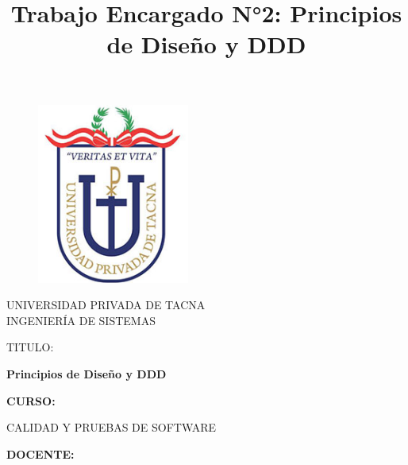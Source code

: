 \documentclass{article}
\begin{document}
\title{Trabajo Encargado N°2: Principios de Diseño y DDD}

\begin{titlepage}
\begin{figure}[htb]
\begin{center}
\includegraphics[width=5cm]{logo.png}
\end{center}
\end{figure}
\vspace*{-0.25in}
\begin{center}
\large{UNIVERSIDAD PRIVADA DE TACNA}\\
\vspace*{-0.025in}
INGENIERÍA DE SISTEMAS  \\

\vspace*{0.5in}
\begin{large}
TITULO:\\
\end{large}

\vspace*{0.1in}
\begin{Large}
\textbf{Principios de Diseño y DDD} \\
\end{Large}

\vspace*{0.3in}
\begin{Large}
\textbf{CURSO:} \\
\end{Large}

\vspace*{0.1in}
\begin{large}
CALIDAD Y PRUEBAS DE SOFTWARE\\
\end{large}

\vspace*{0.3in}
\begin{Large}
\textbf{DOCENTE:} \\
\end{Large}


\end{center}
\end{titlepage}
\end{document}
